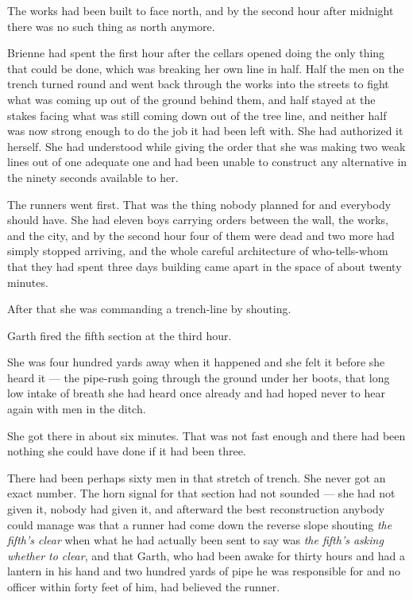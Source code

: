 The works had been built to face north, and by the second hour after midnight there was no such thing as north anymore.

Brienne had spent the first hour after the cellars opened doing the only thing that could be done, which was breaking her own line in half. Half the men on the trench turned round and went back through the works into the streets to fight what was coming up out of the ground behind them, and half stayed at the stakes facing what was still coming down out of the tree line, and neither half was now strong enough to do the job it had been left with. She had authorized it herself. She had understood while giving the order that she was making two weak lines out of one adequate one and had been unable to construct any alternative in the ninety seconds available to her.

The runners went first. That was the thing nobody planned for and everybody should have. She had eleven boys carrying orders between the wall, the works, and the city, and by the second hour four of them were dead and two more had simply stopped arriving, and the whole careful architecture of who-tells-whom that they had spent three days building came apart in the space of about twenty minutes.

After that she was commanding a trench-line by shouting.

\sceneBreak

Garth fired the fifth section at the third hour.

She was four hundred yards away when it happened and she felt it before she heard it — the pipe-rush going through the ground under her boots, that long low intake of breath she had heard once already and had hoped never to hear again with men in the ditch.

She got there in about six minutes. That was not fast enough and there had been nothing she could have done if it had been three.

There had been perhaps sixty men in that stretch of trench. She never got an exact number. The horn signal for that section had not sounded — she had not given it, nobody had given it, and afterward the best reconstruction anybody could manage was that a runner had come down the reverse slope shouting \textit{the fifth’s clear} when what he had actually been sent to say was \textit{the fifth’s asking whether to clear}, and that Garth, who had been awake for thirty hours and had a lantern in his hand and two hundred yards of pipe he was responsible for and no officer within forty feet of him, had believed the runner.

